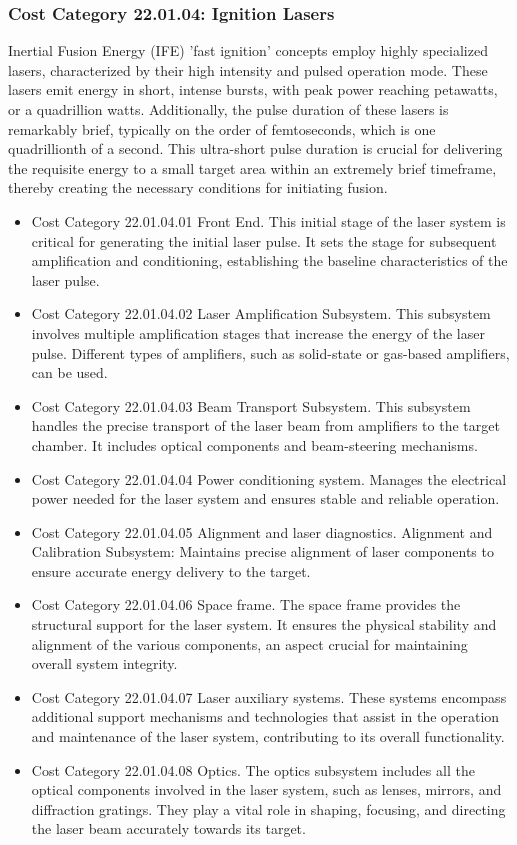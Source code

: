 \subsubsection*{Cost Category 22.01.04: Ignition Lasers}

Inertial Fusion Energy (IFE) 'fast ignition' concepts employ highly specialized lasers, characterized by their high intensity and pulsed operation mode. These lasers emit energy in short, intense bursts, with peak power reaching petawatts, or a quadrillion watts. Additionally, the pulse duration of these lasers is remarkably brief, typically on the order of femtoseconds, which is one quadrillionth of a second. This ultra-short pulse duration is crucial for delivering the requisite energy to a small target area within an extremely brief timeframe, thereby creating the necessary conditions for initiating fusion.

   \begin{itemize} 
   \item Cost Category 22.01.04.01 Front End. This initial stage of the laser system is critical for generating the initial laser pulse. It sets the stage for subsequent amplification and conditioning, establishing the baseline characteristics of the laser pulse.
   \item Cost Category 22.01.04.02 Laser Amplification Subsystem. This subsystem involves multiple amplification stages that increase the energy of the laser pulse. Different types of amplifiers, such as solid-state or gas-based amplifiers, can be used.   
   \item Cost Category 22.01.04.03 Beam Transport Subsystem. This subsystem handles the precise transport of the laser beam from amplifiers to the target chamber. It includes optical components and beam-steering mechanisms.   
   \item Cost Category 22.01.04.04 Power conditioning system. Manages the electrical power needed for the laser system and ensures stable and reliable operation.
   \item Cost Category 22.01.04.05 Alignment and laser diagnostics.  Alignment and Calibration Subsystem: Maintains precise alignment of laser components to ensure accurate energy delivery to the target.
   \item Cost Category 22.01.04.06 Space frame. The space frame provides the structural support for the laser system. It ensures the physical stability and alignment of the various components, an aspect crucial for maintaining overall system integrity.
   \item Cost Category 22.01.04.07 Laser auxiliary systems. These systems encompass additional support mechanisms and technologies that assist in the operation and maintenance of the laser system, contributing to its overall functionality.
   \item Cost Category 22.01.04.08 Optics. The optics subsystem includes all the optical components involved in the laser system, such as lenses, mirrors, and diffraction gratings. They play a vital role in shaping, focusing, and directing the laser beam accurately towards its target.

   \end{itemize}   
   

